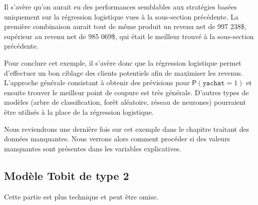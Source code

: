 \documentclass[
  11pt,
  letterpaper,
]{book}
\theoremstyle{definition}
\theoremstyle{definition}
\theoremstyle{definition}
\theoremstyle{remark}
\begin{document}
Il s'avère qu'on aurait eu des performances semblables aux stratégies basées uniquement sur la régression logistique vues à la sous-section précédente. La première combinaison aurait tout de même produit un revenu net de 997 238\$, supérieur au revenu net de 985 069\$, qui était le meilleur trouvé à la sous-section précédente.

Pour conclure cet exemple, il s'avère donc que la régression logistique permet d'effectuer un bon ciblage des clients potentiels afin de maximiser les revenus. L'approche générale consistant à obtenir des prévisions pour \({\mathsf P}\left(\texttt{yachat}=1\right)\) et ensuite trouver le meilleur point de coupure est très générale. D'autres types de modèles (arbre de classification, forêt aléatoire, réseau de neurones) pourraient être utilisés à la place de la régression logistique.

Nous reviendrons une dernière fois sur cet exemple dans le chapitre traitant des données manquantes. Nous verrons alors comment procéder si des valeurs manquantes sont présentes dans les variables explicatives.

\hypertarget{tobit2}{%
\subsection{Modèle Tobit de type 2}\label{tobit2}}

Cette partie est plus technique et peut être omise.
\end{document}
